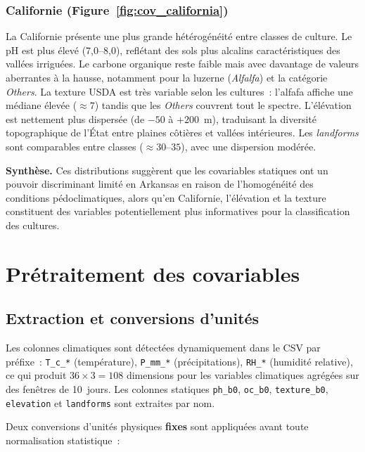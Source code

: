 \subsubsection*{Californie (Figure~\ref{fig:cov_california})}

La Californie présente une plus grande hétérogénéité entre classes de culture. Le pH est plus élevé (7{,}0--8{,}0), reflétant des sols plus alcalins caractéristiques des vallées irriguées. Le carbone organique reste faible mais avec davantage de valeurs aberrantes à la hausse, notamment pour la luzerne (\textit{Alfalfa}) et la catégorie \textit{Others}. La texture USDA est très variable selon les cultures~: l'alfafa affiche une médiane élevée ($\approx 7$) tandis que les \textit{Others} couvrent tout le spectre. L'élévation est nettement plus dispersée (de $-50$ à $+200$~m), traduisant la diversité topographique de l'État entre plaines côtières et vallées intérieures. Les \textit{landforms} sont comparables entre classes ($\approx 30$--$35$), avec une dispersion modérée.

\medskip
\noindent\textbf{Synthèse.} Ces distributions suggèrent que les covariables statiques ont un pouvoir discriminant limité en Arkansas en raison de l'homogénéité des conditions pédoclimatiques, alors qu'en Californie, l'élévation et la texture constituent des variables potentiellement plus informatives pour la classification des cultures.
\section{Prétraitement des covariables}

\subsection{Extraction et conversions d'unités}

Les colonnes climatiques sont détectées dynamiquement dans le CSV par préfixe~:
\texttt{T\_c\_*} (température), \texttt{P\_mm\_*} (précipitations), \texttt{RH\_*}
(humidité relative), ce qui produit $36 \times 3 = 108$ dimensions pour les variables
climatiques agrégées sur des fenêtres de 10~jours. Les colonnes statiques
\texttt{ph\_b0}, \texttt{oc\_b0}, \texttt{texture\_b0}, \texttt{elevation} et
\texttt{landforms} sont extraites par nom.

Deux conversions d'unités physiques \textbf{fixes} sont appliquées avant toute
normalisation statistique~:

